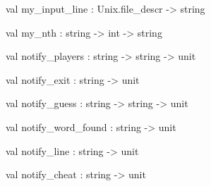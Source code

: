 \documentclass[11pt]{article}
\begin{document}
\label{val:Server.my-underscoreinput-underscoreline}\begin{ocamldoccode}
val my_input_line : Unix.file_descr -> string
\end{ocamldoccode}




\label{val:Server.my-underscorenth}\begin{ocamldoccode}
val my_nth : string -> int -> string
\end{ocamldoccode}




\label{val:Server.notify-underscoreplayers}\begin{ocamldoccode}
val notify_players : string -> string -> unit
\end{ocamldoccode}




\label{val:Server.notify-underscoreexit}\begin{ocamldoccode}
val notify_exit : string -> unit
\end{ocamldoccode}




\label{val:Server.notify-underscoreguess}\begin{ocamldoccode}
val notify_guess : string -> string -> unit
\end{ocamldoccode}




\label{val:Server.notify-underscoreword-underscorefound}\begin{ocamldoccode}
val notify_word_found : string -> unit
\end{ocamldoccode}




\label{val:Server.notify-underscoreline}\begin{ocamldoccode}
val notify_line : string -> unit
\end{ocamldoccode}




\label{val:Server.notify-underscorecheat}\begin{ocamldoccode}
val notify_cheat : string -> unit
\end{ocamldoccode}
\end{document}
